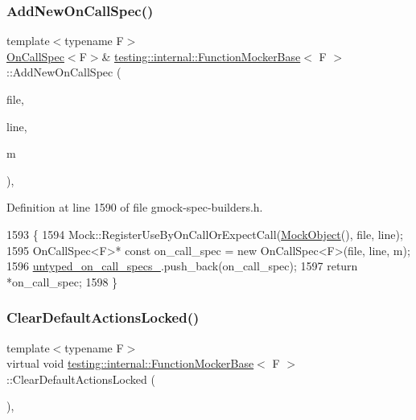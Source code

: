 \subsubsection{\texorpdfstring{Add\+New\+On\+Call\+Spec()}{AddNewOnCallSpec()}}
{\footnotesize\ttfamily template$<$typename F$>$ \\
\hyperlink{classtesting_1_1internal_1_1OnCallSpec}{On\+Call\+Spec}$<$F$>$\& \hyperlink{classtesting_1_1internal_1_1FunctionMockerBase}{testing\+::internal\+::\+Function\+Mocker\+Base}$<$ F $>$\+::Add\+New\+On\+Call\+Spec (\begin{DoxyParamCaption}\item[{const char $\ast$}]{file,  }\item[{int}]{line,  }\item[{const \hyperlink{classtesting_1_1internal_1_1FunctionMockerBase_ab790bcb1dcf57fa6659365386723ae5a}{Argument\+Matcher\+Tuple} \&}]{m }\end{DoxyParamCaption})\hspace{0.3cm}{\ttfamily [inline]}, {\ttfamily [protected]}}



Definition at line 1590 of file gmock-\/spec-\/builders.\+h.


\begin{DoxyCode}
1593                                               \{
1594     Mock::RegisterUseByOnCallOrExpectCall(\hyperlink{classtesting_1_1internal_1_1UntypedFunctionMockerBase_a71863dd67193a7082078d5b366d5ce51}{MockObject}(), file, line);
1595     OnCallSpec<F>* \textcolor{keyword}{const} on\_call\_spec = \textcolor{keyword}{new} OnCallSpec<F>(file, line, m);
1596     \hyperlink{classtesting_1_1internal_1_1UntypedFunctionMockerBase_aed2a1913f6c03fd47c8900039556be34}{untyped\_on\_call\_specs\_}.push\_back(on\_call\_spec);
1597     \textcolor{keywordflow}{return} *on\_call\_spec;
1598   \}
\end{DoxyCode}
\mbox{\label{classtesting_1_1internal_1_1FunctionMockerBase_ada818fcb2b892f21bb939def386599e7}} 
\subsubsection{\texorpdfstring{Clear\+Default\+Actions\+Locked()}{ClearDefaultActionsLocked()}}
{\footnotesize\ttfamily template$<$typename F$>$ \\
virtual void \hyperlink{classtesting_1_1internal_1_1FunctionMockerBase}{testing\+::internal\+::\+Function\+Mocker\+Base}$<$ F $>$\+::Clear\+Default\+Actions\+Locked (\begin{DoxyParamCaption}{ }\end{DoxyParamCaption})\hspace{0.3cm}{\ttfamily [inline]}, {\ttfamily [virtual]}}



